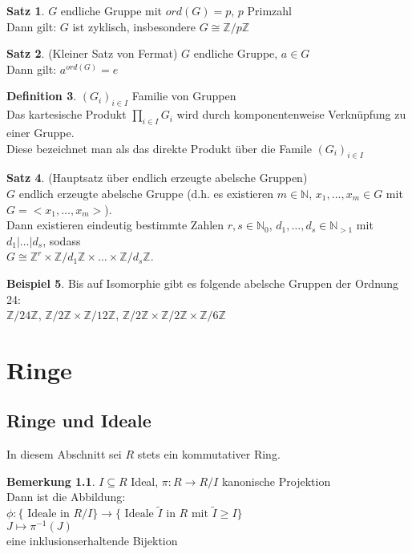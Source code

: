 \documentclass[10pt,a4paper,numbers=endperiod]{scrreprt}
\theoremstyle{definition}
\newtheorem{satz}{Satz}[section]
\newtheorem{defi}[satz]{Definition}
\newtheorem{bem}[satz]{Bemerkung}
\newtheorem{bsp}[satz]{Beispiel}
\def\NN{{\mathbb N}}
\def\ZZ{{\mathbb Z}}
\begin{document}
\begin{satz}
	$G$ endliche Gruppe mit $ord(G) = p$, $p$ Primzahl\\
	Dann gilt: $G$ ist zyklisch, insbesondere $G \cong \ZZ/p\ZZ$
\end{satz}

\begin{satz}
	(Kleiner Satz von Fermat) $G$ endliche Gruppe, $a \in G$\\
	Dann gilt: $a^{ord(G)} = e$
\end{satz}

\begin{defi}
	$(G_i)_{i \in I}$ Familie von Gruppen\\
	Das kartesische Produkt $\prod\limits_{i \in I} G_i$ wird durch komponentenweise Verknüpfung zu einer Gruppe.\\
	Diese bezeichnet man als das direkte Produkt über die Famile $(G_i)_{i \in I}$
\end{defi}

\begin{satz}
	(Hauptsatz über endlich erzeugte abelsche Gruppen)\\
	$G$ endlich erzeugte abelsche Gruppe (d.h. es existieren $m \in \NN$, $x_1, \ldots, x_m \in G$ mit $G = <x_1, \ldots, x_m>$).\\
	Dann existieren eindeutig bestimmte Zahlen $r,s \in \NN_0$, $d_1, \ldots, d_s \in \NN_{>1}$ mit $d_1|\ldots|d_s$, sodass\\
	$G \cong \ZZ^r \times \ZZ/d_1\ZZ \times \ldots \times \ZZ/d_s\ZZ$.
\end{satz}

\begin{bsp}
	Bis auf Isomorphie gibt es folgende abelsche Gruppen der Ordnung 24:\\
	$\ZZ/24\ZZ$, $\ZZ/2\ZZ \times \ZZ/12\ZZ$, $\ZZ/2\ZZ \times \ZZ/2\ZZ \times \ZZ/6\ZZ$
\end{bsp}

\part{Ringe}

\chapter{Ringe und Ideale}

In diesem Abschnitt sei $R$ stets ein kommutativer Ring.\\

\begin{bem}
	$I \subseteq R$ Ideal, $\pi: R \rightarrow R/I$ kanonische Projektion\\
	Dann ist die Abbildung:\\
	$\phi: \{\text{ Ideale in } R/I\} \rightarrow \{\text{ Ideale $\tilde{I}$ in $R$ mit $\tilde{I} \geq I$}\}$\\
	\hspace*{25 mm} $J \mapsto \pi^{-1}(J)$\\
	eine inklusionserhaltende Bijektion
\end{bem}
\end{document}
